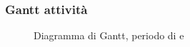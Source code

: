 \subsubsection{Gantt attività}
\begin{figure}[H]
	\centering
	\caption{Diagramma di Gantt, periodo di \PD{} e \Cod{}}
\end{figure}


